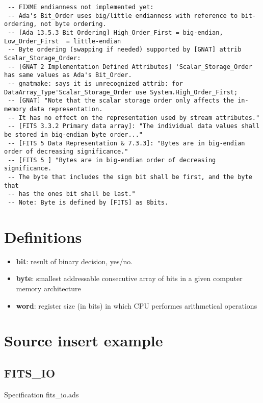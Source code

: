 \documentclass[a4paper,10pt]{article}
\begin{document}
\begin{verbatim}
 -- FIXME endianness not implemented yet:
 -- Ada's Bit_Order uses big/little endianness with reference to bit-ordering, not byte ordering.
 -- [Ada 13.5.3 Bit Ordering] High_Order_First = big-endian, Low_Order_First  = little-endian
 -- Byte ordering (swapping if needed) supported by [GNAT] attrib Scalar_Storage_Order:
 -- [GNAT 2 Implementation Defined Attributes] 'Scalar_Storage_Order has same values as Ada's Bit_Order.
 -- gnatmake: says it is unrecognized attrib: for DataArray_Type'Scalar_Storage_Order use System.High_Order_First;
 -- [GNAT] "Note that the scalar storage order only affects the in-memory data representation.
 -- It has no effect on the representation used by stream attributes."
 -- [FITS 3.3.2 Primary data array]: "The individual data values shall be stored in big-endian byte order..."
 -- [FITS 5 Data Representation & 7.3.3]: "Bytes are in big-endian order of decreasing significance."
 -- [FITS 5 ] "Bytes are in big-endian order of decreasing significance.
 -- The byte that includes the sign bit shall be first, and the byte that
 -- has the ones bit shall be last."
 -- Note: Byte is defined by [FITS] as 8bits.
\end{verbatim}

\section{Definitions}

\begin{itemize}
\item \textbf{bit}: result of binary decision, yes/no.
\item \textbf{byte}: smallest addressable consecutive array of bits in a given computer memory architecture
\item \textbf{word}: register size (in bits) in which CPU performes arithmetical operations
\end{itemize}




\section{Source insert example}

\subsection{FITS\_IO}

Specification fits\_io.ads
\inputminted{ada}{../fits_io.ads}
\end{document}
